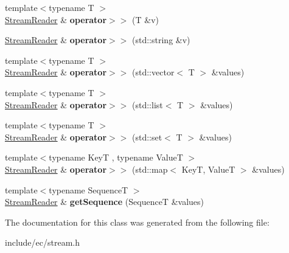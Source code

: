 \begin{DoxyCompactItemize}
\item 
\hypertarget{classStreamReader_aece44bdd35a2f68e342c7fb5b948b1e2}{{\footnotesize template$<$typename T $>$ }\\\hyperlink{classStreamReader}{Stream\-Reader} \& {\bfseries operator$>$$>$} (T \&v)}\label{classStreamReader_aece44bdd35a2f68e342c7fb5b948b1e2}

\item 
\hypertarget{classStreamReader_a3aa384cb975179c1c929d3cdc8b4081f}{\hyperlink{classStreamReader}{Stream\-Reader} \& {\bfseries operator$>$$>$} (std\-::string \&v)}\label{classStreamReader_a3aa384cb975179c1c929d3cdc8b4081f}

\item 
\hypertarget{classStreamReader_adae27d9f995bcdee51d3976a9cd81d58}{{\footnotesize template$<$typename T $>$ }\\\hyperlink{classStreamReader}{Stream\-Reader} \& {\bfseries operator$>$$>$} (std\-::vector$<$ T $>$ \&values)}\label{classStreamReader_adae27d9f995bcdee51d3976a9cd81d58}

\item 
\hypertarget{classStreamReader_ab84b3cfd5503e71c26bf49a501387b39}{{\footnotesize template$<$typename T $>$ }\\\hyperlink{classStreamReader}{Stream\-Reader} \& {\bfseries operator$>$$>$} (std\-::list$<$ T $>$ \&values)}\label{classStreamReader_ab84b3cfd5503e71c26bf49a501387b39}

\item 
\hypertarget{classStreamReader_ac90db140d11fd33de4a5ebce4b39fd66}{{\footnotesize template$<$typename T $>$ }\\\hyperlink{classStreamReader}{Stream\-Reader} \& {\bfseries operator$>$$>$} (std\-::set$<$ T $>$ \&values)}\label{classStreamReader_ac90db140d11fd33de4a5ebce4b39fd66}

\item 
\hypertarget{classStreamReader_a0a754700ae656e48c883b1dda679127f}{{\footnotesize template$<$typename Key\-T , typename Value\-T $>$ }\\\hyperlink{classStreamReader}{Stream\-Reader} \& {\bfseries operator$>$$>$} (std\-::map$<$ Key\-T, Value\-T $>$ \&values)}\label{classStreamReader_a0a754700ae656e48c883b1dda679127f}

\item 
\hypertarget{classStreamReader_aeb033c7526731bb85099ca0f0f3f879c}{{\footnotesize template$<$typename Sequence\-T $>$ }\\\hyperlink{classStreamReader}{Stream\-Reader} \& {\bfseries get\-Sequence} (Sequence\-T \&values)}\label{classStreamReader_aeb033c7526731bb85099ca0f0f3f879c}

\end{DoxyCompactItemize}


The documentation for this class was generated from the following file\-:\begin{DoxyCompactItemize}
\item 
include/ec/stream.\-h\end{DoxyCompactItemize}
